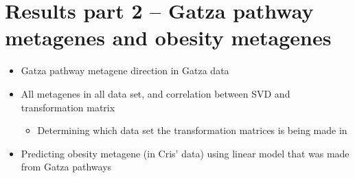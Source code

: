 \documentclass[a4paper, 10pt]{article}
\begin{document}
	\section*{Results part 2 -- Gatza pathway metagenes and obesity metagenes}
	\begin{itemize}
		\item Gatza pathway metagene direction in Gatza data
		\item All metagenes in all data set, and correlation between SVD and transformation matrix
			\begin{itemize}
				\item Determining which data set the transformation matrices is being made in
			\end{itemize}
		\item Predicting obesity metagene (in Cris' data) using linear model that was made from Gatza pathways
	\end{itemize}
\end{document}
